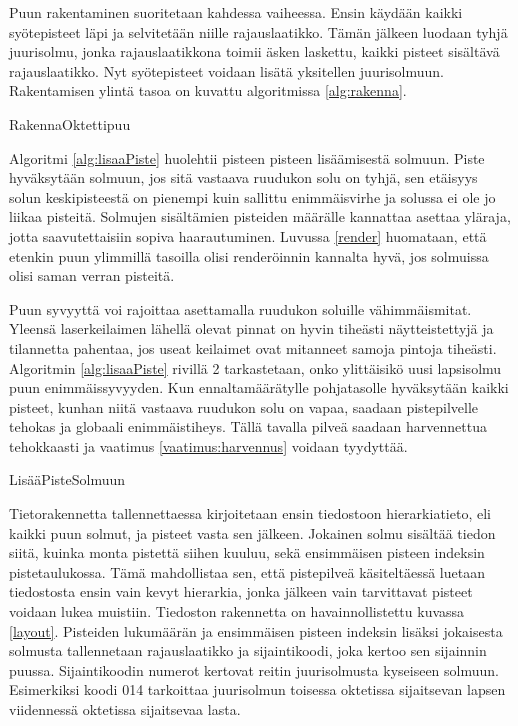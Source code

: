 Puun rakentaminen suoritetaan kahdessa vaiheessa. Ensin käydään kaikki syötepisteet läpi ja selvitetään niille rajauslaatikko. Tämän jälkeen luodaan tyhjä juurisolmu, jonka rajauslaatikkona toimii äsken laskettu, kaikki pisteet sisältävä rajauslaatikko. Nyt syötepisteet voidaan lisätä yksitellen juurisolmuun. Rakentamisen ylintä tasoa on kuvattu algoritmissa \ref{alg:rakenna}.

\begin{algorithm}[H]
    \caption{RakennaOktettipuu}
    \label{alg:rakenna}
    
\end{algorithm}
\vspace*{0.5cm}

Algoritmi \ref{alg:lisaaPiste} huolehtii pisteen pisteen lisäämisestä solmuun. Piste hyväksytään solmuun, jos sitä vastaava ruudukon solu on tyhjä, sen etäisyys solun keskipisteestä on pienempi kuin sallittu enimmäisvirhe ja solussa ei ole jo liikaa pisteitä. Solmujen sisältämien pisteiden määrälle kannattaa asettaa yläraja, jotta saavutettaisiin sopiva haarautuminen. Luvussa \ref{render} huomataan, että etenkin puun ylimmillä tasoilla olisi renderöinnin kannalta hyvä, jos solmuissa olisi saman verran pisteitä.

Puun syvyyttä voi rajoittaa asettamalla ruudukon soluille vähimmäismitat. Yleensä laserkeilaimen lähellä olevat pinnat on hyvin tiheästi näytteistettyjä ja tilannetta pahentaa, jos useat keilaimet ovat mitanneet samoja pintoja tiheästi. Algoritmin \ref{alg:lisaaPiste} rivillä 2 tarkastetaan, onko ylittäisikö uusi lapsisolmu puun enimmäissyvyyden. Kun ennaltamäärätylle pohjatasolle hyväksytään kaikki pisteet, kunhan niitä vastaava ruudukon solu on vapaa, saadaan pistepilvelle tehokas ja globaali enimmäistiheys. Tällä tavalla pilveä saadaan harvennettua tehokkaasti ja vaatimus \ref{vaatimus:harvennus} voidaan tyydyttää. %


\begin{algorithm}[H]
    \caption{LisääPisteSolmuun}
    \label{alg:lisaaPiste}
    
\end{algorithm}
\vspace*{0.5cm}   

Tietorakennetta tallennettaessa kirjoitetaan ensin tiedostoon hierarkiatieto, eli kaikki puun solmut, ja pisteet vasta sen jälkeen. Jokainen solmu sisältää tiedon siitä, kuinka monta pistettä siihen kuuluu, sekä ensimmäisen pisteen indeksin pistetaulukossa. Tämä mahdollistaa sen, että pistepilveä käsiteltäessä luetaan tiedostosta ensin vain kevyt hierarkia, jonka jälkeen vain tarvittavat pisteet voidaan lukea muistiin. Tiedoston rakennetta on havainnollistettu kuvassa \ref{layout}. Pisteiden lukumäärän ja ensimmäisen pisteen indeksin lisäksi jokaisesta solmusta tallennetaan rajauslaatikko ja sijaintikoodi, joka kertoo sen sijainnin puussa. Sijaintikoodin  numerot kertovat reitin juurisolmusta kyseiseen solmuun. Esimerkiksi koodi 014 tarkoittaa juurisolmun toisessa oktetissa sijaitsevan lapsen viidennessä oktetissa sijaitsevaa lasta. 

